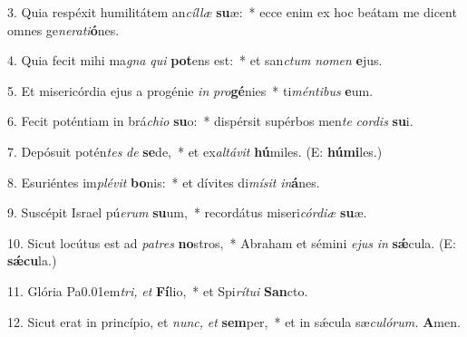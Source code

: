 \item 3. Quia respéxit humilitátem an\textit{cíllæ} \textbf{su}æ:~* ecce enim ex hoc beátam me dicent omnes ge\textit{nerati}\textbf{ó}nes.

\item 4. Quia fecit mihi ma\textit{gna} \textit{qui} \textbf{pot}ens est:~* et san\textit{ctum} \textit{nomen} \textbf{e}jus.

\item 5. Et misericórdia ejus a progénie \textit{in} \textit{pro}\textbf{gé}nies~* ti\textit{méntibus} \textbf{e}um.

\item 6. Fecit poténtiam in brá\textit{chio} \textbf{su}o:~* dispérsit supérbos men\textit{te} \textit{cordis} \textbf{su}i.

\item 7. Depósuit potén\textit{tes} \textit{de} \textbf{se}de,~* et ex\hspace{0.03em}\textit{altávit} \textbf{hú}miles. (E: \textbf{hú}\textbf{mi}les.)

\item 8. Esuriéntes im\textit{plévit} \textbf{bo}nis:~* et dívites di\textit{mísit} \textit{in}\textbf{á}nes.

\item 9. Suscépit Israel pú\textit{erum} \textbf{su}um,~* recordátus miseri\hspace{0.03em}\textit{córdiæ} \textbf{su}æ.

\item 10. Sicut locútus est ad \textit{patres} \textbf{no}stros,~* Abraham et sémini \textit{ejus} \textit{in}  \textbf{sǽ}cula. (E: \textbf{sǽcu}la.)

\item 11. Glória Pa\kern 0.01em\textit{tri,} \textit{et} \textbf{Fí}lio,~* et Spi\textit{rítui} \textbf{San}cto.

\item 12. Sicut erat in princípio, et \textit{nunc,} \textit{et} \textbf{sem}per,~* et in sǽcula sæ\hspace{0.03em}\textit{culórum.} \textbf{A}men.

